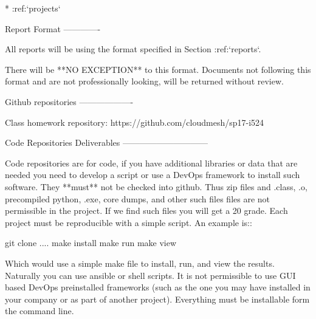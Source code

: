    * :ref:`projects`

    

Report Format
-------------

All reports will be using the format specified in Section :ref:`reports`.

There will be **NO EXCEPTION** to this format. Documents not following
this format and are not professionally looking, will be returned
without review.

Github repositories
-------------------

Class homework repository: https://github.com/cloudmesh/sp17-i524



Code Repositories Deliverables
------------------------------

Code repositories are for code, if you have additional libraries or
data that are needed you need to develop a script or use a DevOps
framework to install such software. They **must** not be checked into
github. Thus zip files and .class, .o, precompiled python, .exe, core
dumps, and other such files files are not permissible in the
project. If we find such files you will get a 20%
grade. Each project must be reproducible with a simple script. An
example is::

    git clone ....
    make install
    make run
    make view

Which would use a simple make file to install, run, and view the
results. Naturally you can use ansible or shell scripts. It is not
permissible to use GUI based DevOps preinstalled frameworks (such as
the one you may have installed in your company or as part of another
project). Everything must be installable form the command line.

